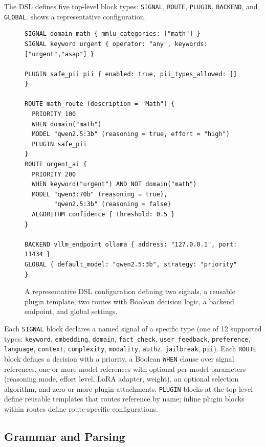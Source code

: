 The DSL defines five top-level block types: \texttt{SIGNAL}, \texttt{ROUTE}, \texttt{PLUGIN}, \texttt{BACKEND}, and \texttt{GLOBAL}.
 shows a representative configuration.

\begin{figure}[!htbp]
\centering
\footnotesize
\begin{verbatim}
SIGNAL domain math { mmlu_categories: ["math"] }
SIGNAL keyword urgent { operator: "any", keywords: ["urgent","asap"] }

PLUGIN safe_pii pii { enabled: true, pii_types_allowed: [] }

ROUTE math_route (description = "Math") {
  PRIORITY 100
  WHEN domain("math")
  MODEL "qwen2.5:3b" (reasoning = true, effort = "high")
  PLUGIN safe_pii
}
ROUTE urgent_ai {
  PRIORITY 200
  WHEN keyword("urgent") AND NOT domain("math")
  MODEL "qwen3:70b" (reasoning = true),
        "qwen2.5:3b" (reasoning = false)
  ALGORITHM confidence { threshold: 0.5 }
}

BACKEND vllm_endpoint ollama { address: "127.0.0.1", port: 11434 }
GLOBAL { default_model: "qwen2.5:3b", strategy: "priority" }
\end{verbatim}
\caption{A representative DSL configuration defining two signals, a reusable plugin template, two routes with Boolean decision logic, a backend endpoint, and global settings.}
\label{fig:dsl_example}
\end{figure}

Each \texttt{SIGNAL} block declares a named signal of a specific type (one of 12 supported types: \texttt{keyword}, \texttt{embedding}, \texttt{domain}, \texttt{fact\_check}, \texttt{user\_feedback}, \texttt{preference}, \texttt{language}, \texttt{context}, \texttt{complexity}, \texttt{modality}, \texttt{authz}, \texttt{jailbreak}, \texttt{pii}).
Each \texttt{ROUTE} block defines a decision with a priority, a Boolean \texttt{WHEN} clause over signal references, one or more model references with optional per-model parameters (reasoning mode, effort level, LoRA adapter, weight), an optional selection algorithm, and zero or more plugin attachments.
\texttt{PLUGIN} blocks at the top level define reusable templates that routes reference by name; inline plugin blocks within routes define route-specific configurations.

\subsection{Grammar and Parsing}
\label{sec:dsl_grammar}

